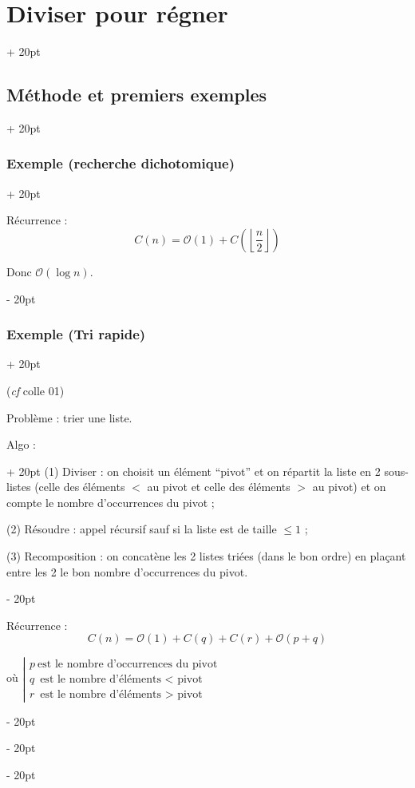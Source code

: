 \documentclass[a4paper, 12pt, twoside]{article}
\newcommand{\lr}[1]{\left( #1 \right)}
\newcommand{\floor}[1]{\left\lfloor #1 \right\rfloor}
\renewcommand{\le}{\leqslant}
\newcommand{\ind}[1][20pt]{\advance\leftskip + #1}
\newcommand{\deind}[1][20pt]{\advance\leftskip - #1}
\newenvironment{indt}[2][20pt]{#2 \par \ind[#1]}{\par \deind} %
\begin{document}
\begin{indt}{\section{Diviser pour régner}}
\begin{indt}{\subsection{Méthode et premiers exemples}}
\begin{indt}{\subsubsection{Exemple (recherche dichotomique)}}
                \vspace{6pt}
                
                Récurrence :
                    \[ C(n) = \mathcal O(1) + C\lr{\floor{\dfrac n 2}} \]
                
                Donc $\mathcal O(\log n)$.
            \end{indt}
            
            \vspace{12pt}
            
            \begin{indt}{\subsubsection{Exemple (Tri rapide)}}
                \label{2.1.7}
                
                (\textit{cf} colle 01)
                
                Problème : trier une liste.
                
                \begin{indt}{Algo :}
                    (1) Diviser : on choisit un élément ``pivot'' et on répartit la liste en 2 sous-listes (celle des éléments $<$ au pivot et celle des éléments $>$ au pivot) et on compte le nombre d'occurrences du pivot ;
                    
                    (2) Résoudre : appel récursif sauf si la liste est de taille $\le 1$ ;
                    
                    (3) Recomposition : on concatène les 2 listes triées (dans le bon ordre) en plaçant entre les 2 le bon nombre d'occurrences du pivot.
                \end{indt}
                
                \vspace{6pt}
                
                Récurrence :
                    \[ C(n) = \mathcal O(1) + C(q) + C(r) + \mathcal O(p + q) \]
                
                où
                $
                    \left|
                    \begin{array}{l}
                        p\ \text{est le  nombre d'occurrences du pivot}
                        \\
                        q\ \text{est le nombre d'éléments $<$ pivot}
                        \\
                        r\ \text{est le nombre d'éléments $>$ pivot}
                    \end{array}
                    \right.
                $
                

\end{indt}
\end{indt}
\end{indt}
\end{document}
